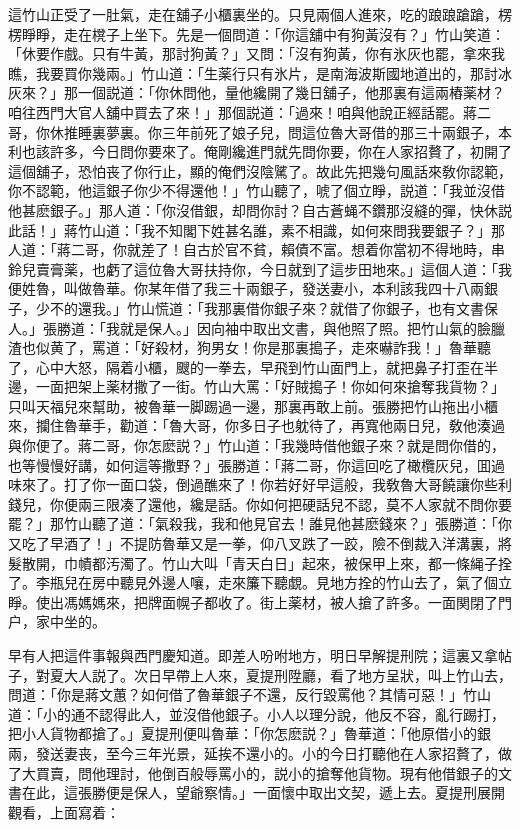 這竹山正受了一肚氣，走在舖子小櫃裏坐的。只見兩個人進來，吃的踉踉蹌蹌，楞楞睜睜，走在櫈子上坐下。先是一個問道：「你這舖中有狗黃沒有？」竹山笑道：「休要作戲。只有牛黃，那討狗黃？」又問：「沒有狗黃，你有氷灰也罷，拿來我瞧，我要買你幾兩。」竹山道：「生薬行只有氷片，是南海波斯國地道出的，那討冰灰來？」那一個説道：「你休問他，量他纔開了幾日舖子，他那裏有這兩樁薬材？咱往西門大官人舖中買去了來！」那個説道：「過來！咱與他說正經話罷。蔣二哥，你休推睡裏夢裏。你三年前死了娘子兒，問這位魯大哥借的那三十兩銀子，本利也該許多，今日問你要來了。俺剛纔進門就先問你要，你在人家招贅了，初開了這個舖子，恐怕丧了你行止，顯的俺們沒陰騭了。故此先把幾句風話來敎你認範，你不認範，他這銀子你少不得還他！」竹山聽了，唬了個立睜，説道：「我並沒借他甚麽銀子。」那人道：「你沒借銀，却問你討？自古蒼蝇不鑽那沒縫的彈，快休説此話！」蔣竹山道：「我不知閣下姓甚名誰，素不相識，如何來問我要銀子？」那人道：「蔣二哥，你就差了！自古於官不貧，賴債不富。想着你當初不得地時，串鈴兒賣膏薬，也虧了這位魯大哥扶持你，今日就到了這步田地來。」這個人道：「我便姓魯，叫做魯華。你某年借了我三十兩銀子，發送妻小，本利該我四十八兩銀子，少不的還我。」竹山慌道：「我那裏借你銀子來？就借了你銀子，也有文書保人。」張勝道：「我就是保人。」因向袖中取出文書，與他照了照。把竹山氣的臉臘渣也似黄了，罵道：「好殺材，狗男女！你是那裏搗子，走來嚇詐我！」魯華聽了，心中大怒，隔着小櫃，颼的一拳去，早飛到竹山面門上，就把鼻子打歪在半邊，一面把架上薬材撒了一街。竹山大罵：「好賊搗子！你如何來搶奪我貨物？」只叫天福兒來幫助，被魯華一脚踢過一邊，那裏再敢上前。張勝把竹山拖出小櫃來，攔住魯華手，勸道：「魯大哥，你多日子也躭待了，再寬他兩日兒，敎他湊過與你便了。蔣二哥，你怎麽説？」竹山道：「我幾時借他銀子來？就是問你借的，也等慢慢好講，如何這等撒野？」張勝道：「蔣二哥，你這回吃了橄欖灰兒，囬過味來了。打了你一面口袋，倒過醮來了！你若好好早這般，我敎魯大哥饒讓你些利錢兒，你便兩三限凑了還他，纔是話。你如何把硬話兒不認，莫不人家就不問你要罷？」那竹山聽了道：「氣殺我，我和他見官去！誰見他甚麽錢來？」張勝道：「你又吃了早酒了！」不提防魯華又是一拳，仰八叉跌了一跤，險不倒裁入洋溝裏，將髮散開，巾幘都汚濁了。竹山大叫「青天白日」起來，被保甲上來，都一條䋲子拴了。李瓶兒在房中聽見外邊人嚷，走來簾下聽覷。見地方拴的竹山去了，氣了個立睜。使出馮媽媽來，把牌面幌子都收了。街上薬材，被人搶了許多。一面関閉了門户，家中坐的。

早有人把這件事報與西門慶知道。即差人吩咐地方，明日早解提刑院；這裏又拿帖子，對夏大人説了。次日早帶上人來，夏提刑陞廳，看了地方呈狀，叫上竹山去，問道：「你是蔣文蕙？如何借了魯華銀子不還，反行毀罵他？其情可惡！」竹山道：「小的通不認得此人，並沒借他銀子。小人以理分說，他反不容，亂行踢打，把小人貨物都搶了。」夏提刑便叫魯華：「你怎麽説？」魯華道：「他原借小的銀兩，發送妻丧，至今三年光景，延挨不還小的。小的今日打聽他在人家招贅了，做了大買賣，問他理討，他倒百般辱罵小的，説小的搶奪他貨物。現有他借銀子的文書在此，這張勝便是保人，望爺察情。」一面懷中取出文契，遞上去。夏提刑展開觀看，上面寫着：

